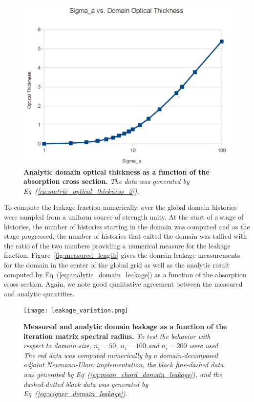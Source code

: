 \documentclass[letterpaper,12pt]{article}
\begin{document}
\begin{figure}[t!]
  \begin{center}
    \includegraphics[width=5in,clip]{optical_thickness.png}
  \end{center}
  \caption{\textbf{Analytic domain optical thickness as a function of
      the absorption cross section.} \textit{The data was
      generated by Eq~(\ref{eq:matrix_optical_thickness_2}).}}
  \label{fig:optical_thickness}
\end{figure}

To compute the leakage fraction numerically, over the global domain
 histories were sampled from a uniform source of strength
unity. At the start of a stage of histories, the number of histories
starting in the domain was computed and as the stage progressed, the
number of histories that exited the domain was tallied with the ratio
of the two numbers providing a numerical measure for the leakage
fraction. Figure~\ref{fig:measured_length} gives the domain leakage
measurements for the domain in the center of the global grid as well
as the analytic result computed by
Eq~(\ref{eq:analytic_domain_leakage}) as a function of the absorption
cross section. Again, we note good qualitative agreement between the
measured and analytic quantities.
\begin{figure}[t!]
  \begin{center}
    \texttt{[image: leakage\_variation.png]}
  \end{center}
  \caption{\textbf{Measured and analytic domain leakage as a function
      of the iteration matrix spectral radius.} \textit{To test the
      behavior with respect to domain size, $n_i=50$, $n_i=100$,and
      $n_i=200$ were used. The red data was computed numerically by a
      domain-decomposed adjoint Neumann-Ulam implementation, the black
      fine-dashed data was generated by
      Eq~(\ref{eq:mean_chord_domain_leakage}), and the dashed-dotted
      black data was generated by
      Eq~(\ref{eq:wigner_domain_leakage}).}}
  \label{fig:measured_leakage}
\end{figure}
\end{document}
